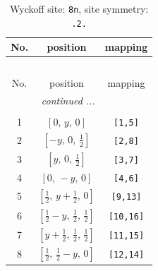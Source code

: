 \documentclass[fleqn,8pt]{jsarticle}
\begin{document}
\begin{longtable}{ccc}
\caption{Wyckoff site: {\tt 8n}, site symmetry: {\tt .2.}}
 \\
 \hline \hline
No. & position & mapping \\ \hline \endfirsthead

\multicolumn{2}{l}{\tablename\ \thetable{}} \\
 \hline \hline
No. & position & mapping \\ \hline \endhead

 \hline \hline
\multicolumn{2}{r}{\footnotesize\it continued ...} \\ \endfoot

 \hline \hline
\multicolumn{2}{r}{} \\ \endlastfoot

1 & $\left[ 0,\, y,\, 0 \right]$ & {\tt [1,5]} \\ \hline
2 & $\left[ - y,\, 0,\, \frac{1}{2} \right]$ & {\tt [2,8]} \\ \hline
3 & $\left[ y,\, 0,\, \frac{1}{2} \right]$ & {\tt [3,7]} \\ \hline
4 & $\left[ 0,\, - y,\, 0 \right]$ & {\tt [4,6]} \\ \hline
5 & $\left[ \frac{1}{2},\, y + \frac{1}{2},\, 0 \right]$ & {\tt [9,13]} \\ \hline
6 & $\left[ \frac{1}{2} - y,\, \frac{1}{2},\, \frac{1}{2} \right]$ & {\tt [10,16]} \\ \hline
7 & $\left[ y + \frac{1}{2},\, \frac{1}{2},\, \frac{1}{2} \right]$ & {\tt [11,15]} \\ \hline
8 & $\left[ \frac{1}{2},\, \frac{1}{2} - y,\, 0 \right]$ & {\tt [12,14]} \\
\end{longtable}
\renewcommand{\arraystretch}{1.2}
\end{document}

